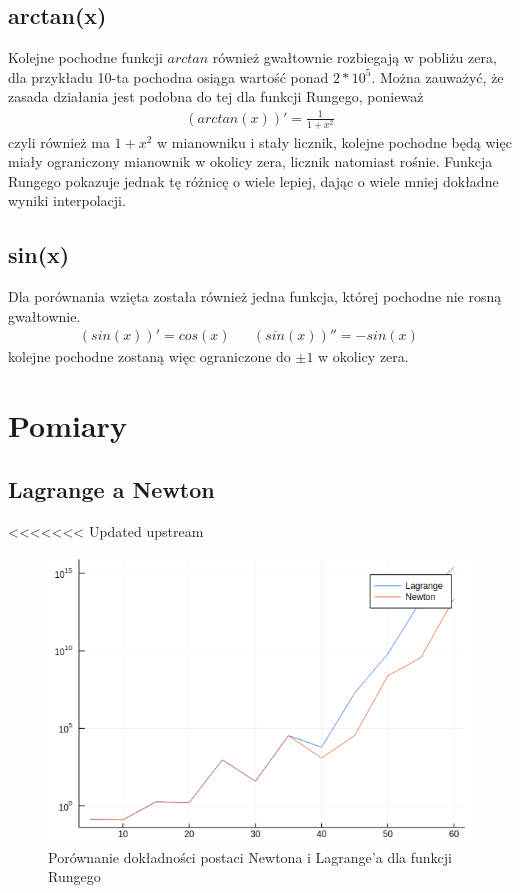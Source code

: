 \documentclass[paper=a4, fontsize=11pt]{scrartcl} %
\numberwithin{equation}{section} %
\numberwithin{figure}{section} %
\numberwithin{table}{section} %
\begin{document}
\subsection{arctan(x)}
Kolejne pochodne funkcji $arctan$ również gwałtownie rozbiegają w pobliżu zera,
dla przykładu 10-ta pochodna osiąga wartość ponad $2*10^5$. Można zauważyć, 
że zasada działania jest podobna do tej dla funkcji Rungego, ponieważ 
\begin{align}
 (arctan(x))' = \frac{1}{1+x^2}
\end{align}
czyli również ma $1+x^2$ w mianowniku i stały licznik, kolejne pochodne będą więc
miały ograniczony mianownik w okolicy zera, licznik natomiast rośnie.
Funkcja Rungego pokazuje jednak tę różnicę o wiele lepiej, dając o wiele mniej
dokładne wyniki interpolacji.

\subsection{sin(x)}
Dla porównania wzięta została również jedna funkcja, której pochodne nie rosną gwałtownie.
\begin{align}
 (sin(x))' = cos(x) &&
 (sin(x))'' = -sin(x) &&
\end{align}
kolejne pochodne zostaną więc ograniczone do $\pm1$ w okolicy zera.

\section{Pomiary}

\subsection{Lagrange a Newton}
<<<<<<< Updated upstream

\begin{figure}[h!]
  \includegraphics[width=\linewidth]{lagnew.png}
  \caption{Porównanie dokładności postaci Newtona i Lagrange'a dla funkcji Rungego}
  \label{lagnew}
\end{figure} 
\end{document}
